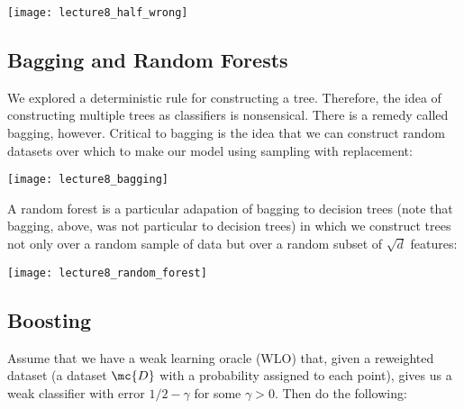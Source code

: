 \documentclass[../main.tex]{subfiles}
\begin{document}
    \begin{center}
        \texttt{[image: lecture8\_half\_wrong]}
    \end{center}

    \subsection{Bagging and Random Forests}


    \begin{remark}
        We explored a deterministic rule for constructing a tree. Therefore, the idea
        of constructing multiple trees as classifiers is nonsensical. There is a remedy
        called bagging, however. Critical to bagging is the idea that we can construct
        random datasets over which to make our model using sampling with replacement:
    \end{remark}

    \begin{center}
        \texttt{[image: lecture8\_bagging]}
    \end{center}

    \begin{remark}
        A random forest is a particular adapation of bagging to decision trees (note that
        bagging, above, was not particular to decision trees) in which we construct
        trees not only over a random sample of data but over a random subset of $\sqrt{d}$
        features:
    \end{remark}

    \begin{center}
        \texttt{[image: lecture8\_random\_forest]}
    \end{center}

    \subsection{Boosting}

    \begin{definition}
        Assume that we have a weak learning oracle (WLO) that, given a reweighted
        dataset (a dataset $\mc{D}$ with a probability assigned to each point),
        gives us a weak classifier with error $1/2 - \gamma$ for some $\gamma > 0$. Then
        do the following:
    \end{definition}
\end{document}
